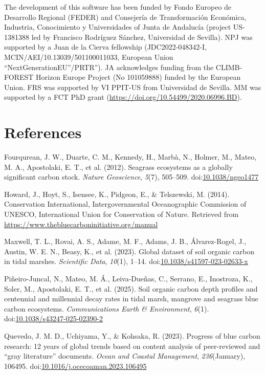 \documentclass[10pt,a4paper,onecolumn]{article}
\newlength{\cslhangindent}
\newenvironment{CSLReferences}[2] %
 {\begin{list}{}{%
  \setlength{\itemindent}{0pt}
  \setlength{\leftmargin}{0pt}
  \setlength{\parsep}{0pt}
  \ifodd #1
   \setlength{\leftmargin}{\cslhangindent}
   \setlength{\itemindent}{-1\cslhangindent}
  \fi
  \setlength{\itemsep}{#2\baselineskip}}}
 {\end{list}}
\begin{document}
The development of this software has been funded by Fondo Europeo de
Desarrollo Regional (FEDER) and Consejería de Transformación Económica,
Industria, Conocimiento y Universidades of Junta de Andalucía (project
US-1381388 led by Francisco Rodríguez Sánchez, Universidad de Sevilla).
NPJ was supported by a Juan de la Cierva fellowship (JDC2022-048342-I,
MCIN/AEI/10.13039/501100011033, European Union
``NextGenerationEU''/PRTR''). JA acknowledges funding from the
CLIMB-FOREST Horizon Europe Project (No 101059888) funded by the
European Union. FRS was supported by VI PPIT-US from Universidad de
Sevilla. MM was supported by a FCT PhD grant
(\url{https://doi.org/10.54499/2020.06996.BD}).

\section*{References}\label{references}

\label{refs}
\begin{CSLReferences}{1}{0}
Fourqurean, J. W., Duarte, C. M., Kennedy, H., Marbà, N., Holmer, M.,
Mateo, M. A., Apostolaki, E. T., et al. (2012). Seagrass ecosystems as a
globally significant carbon stock. \emph{Nature Geoscience},
\emph{5}(7), 505--509.
doi:\href{https://doi.org/10.1038/ngeo1477}{10.1038/ngeo1477}

Howard, J., Hoyt, S., Isensee, K., Pidgeon, E., \& Telszewski, M.
(2014). Conservation International, Intergovernmental Oceanographic
Commission of UNESCO, International Union for Conservation of Nature.
Retrieved from \url{https://www.thebluecarboninitiative.org/manual}

Maxwell, T. L., Rovai, A. S., Adame, M. F., Adams, J. B., Álvarez-Rogel,
J., Austin, W. E. N., Beasy, K., et al. (2023). Global dataset of soil
organic carbon in tidal marshes. \emph{Scientific Data}, \emph{10}(1),
1--14.
doi:\href{https://doi.org/10.1038/s41597-023-02633-x}{10.1038/s41597-023-02633-x}

Piñeiro-Juncal, N., Mateo, M. Á., Leiva-Dueñas, C., Serrano, E.,
Inostroza, K., Soler, M., Apostolaki, E. T., et al. (2025). Soil organic
carbon depth profiles and centennial and millennial decay rates in tidal
marsh, mangrove and seagrass blue carbon ecosystems.
\emph{Communications Earth \& Environment}, \emph{6}(1).
doi:\href{https://doi.org/10.1038/s43247-025-02390-2}{10.1038/s43247-025-02390-2}

Quevedo, J. M. D., Uchiyama, Y., \& Kohsaka, R. (2023). Progress of blue
carbon research: 12 years of global trends based on content analysis of
peer-reviewed and {``gray literature''} documents. \emph{Ocean and
Coastal Management}, \emph{236}(January), 106495.
doi:\href{https://doi.org/10.1016/j.ocecoaman.2023.106495}{10.1016/j.ocecoaman.2023.106495}

\end{CSLReferences}
\end{document}
